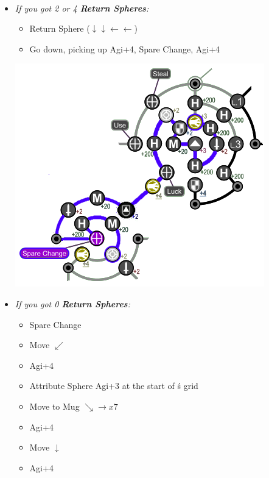 \bothvfill\winvfill\lossvfill
\ 
\colend
\begin{spheregrid}
	\begin{multicols}{2}
		\begin{itemize}
			\item \textit{If you got 2 or 4 \textbf{Return Spheres}:}
				\begin{itemize}
					\yunaf Attribute Sphere \rikku's +3 Agi (hold $\leftarrow$)
					\item Return Sphere ($\downarrow \downarrow \leftarrow \leftarrow$)
					\item Go down, picking up Agi+4, Spare Change, Agi+4
				\end{itemize}
				\includegraphics[width=.8\columnwidth]{graphics/4_Return_final_grid}
			\item \textit{If you got 0 \textbf{Return Spheres}:}
				\begin{itemize}
					\item Spare Change
					\item Move $\swarrow$
					\item Agi+4
					\item Attribute Sphere Agi+3 at the start of \rikku\'s grid
					\item Move to Mug $\searrow\rightarrow x7$
					\item Agi+4
					\item Move $\downarrow$
					\item Agi+4
				\end{itemize}

\end{itemize}
\end{multicols}
\end{spheregrid}
